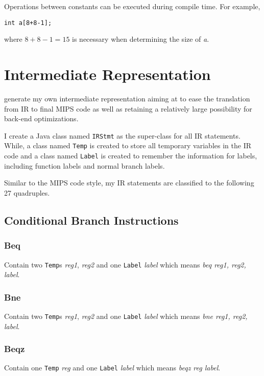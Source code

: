 \documentclass[journal]{IEEEtran}
\begin{document}
Operations between constants can be executed during compile time. For example, 
\begin{center}
\texttt{int a[8+8-1];}
\end{center}
where $8+8-1=15$ is necessary when determining the size of \textit{a}.

\section{Intermediate Representation}

 generate my own intermediate representation aiming at to ease the translation from IR to final MIPS code as well as retaining a relatively large possibility for back-end optimizations. 

I create a Java class named \texttt{IRStmt} as the super-class for all IR statements. While, a class named \texttt{Temp} is created to store all temporary variables in the IR code and a class named \texttt{Label} is created to remember the information for labels, including function labels and normal branch labels.

Similar to the MIPS code style, my IR statements are classified to the following 27 quadruples.

\subsection{Conditional Branch Instructions}

\subsubsection{Beq} 
Contain two \texttt{Temp}s \textit{reg1}, \textit{reg2} and one \texttt{Label} \textit{label} which means \textit{beq reg1, reg2, label}.

\subsubsection{Bne} 
Contain two \texttt{Temp}s \textit{reg1}, \textit{reg2} and one \texttt{Label} \textit{label} which means \textit{bne reg1, reg2, label}.

\subsubsection{Beqz} 
Contain one \texttt{Temp} \textit{reg} and one \texttt{Label} \textit{label} which means \textit{beqz reg label}.
\end{document}
